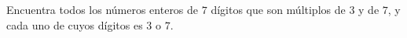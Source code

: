 Encuentra todos los números enteros de $7$ dígitos que son múltiplos de $3$ y de $7$, y cada uno de cuyos dígitos es $3$ o $7$.